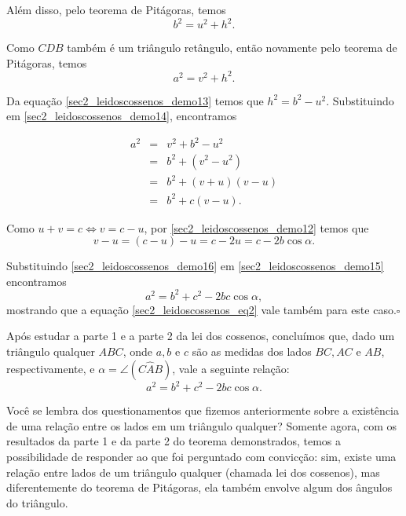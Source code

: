 Além disso, pelo teorema de Pitágoras, temos
 \begin{equation} 
    b^2=u^2+h^2. \label{sec2_leidoscossenos_demo13}
\end{equation}

Como $CDB$ também é um triângulo retângulo, então novamente pelo teorema de Pitágoras, temos
\begin{equation}
    a^2=v^2+h^2. \label{sec2_leidoscossenos_demo14}
\end{equation}

Da equação \eqref{sec2_leidoscossenos_demo13} temos que $h^2=b^2-u^2$. Substituindo em \eqref{sec2_leidoscossenos_demo14}, encontramos

\begin{eqnarray}{}
   a^2 & = & v^2+b^2-u^2 \nonumber\\
       & = & b^2+(v^2-u^2) \nonumber \\
       & = & b^2+(v+u)(v-u) \nonumber\\
       & = & b^2+c(v-u).\label{sec2_leidoscossenos_demo15}
\end{eqnarray}

Como $u+v=c \iff v=c-u$, por \eqref{sec2_leidoscossenos_demo12} temos que
\begin{equation}
    v-u=(c-u)-u=c-2u= c-2b\cos\alpha. \label{sec2_leidoscossenos_demo16}
\end{equation}

Substituindo \eqref{sec2_leidoscossenos_demo16} em \eqref{sec2_leidoscossenos_demo15} encontramos
$$a^2=b^2+c^2-2bc\cos\alpha,$$
mostrando que a equação \eqref{sec2_leidoscossenos_eq2} vale também para este caso.\hspace{4.5cm}$\square$


Após estudar a parte 1 e a parte 2 da lei dos cossenos, concluímos que, dado um triângulo qualquer $ABC$, onde $a, b$ e $c$ são as medidas dos lados $BC, AC$ e $AB$, respectivamente, e $\alpha=\angle(C\hat{A}B)$, vale a seguinte relação:
$$a^2=b^2+c^2-2bc\cos\alpha.$$

Você se lembra dos questionamentos que fizemos anteriormente sobre a existência de uma relação entre os lados em um triângulo qualquer? Somente agora, com os resultados da parte 1 e da parte 2 do teorema demonstrados, temos a possibilidade de responder ao que foi perguntado com convicção: sim, existe uma relação entre lados de um triângulo qualquer (chamada lei dos cossenos), mas diferentemente do teorema de Pitágoras, ela também envolve algum dos ângulos do triângulo. 

